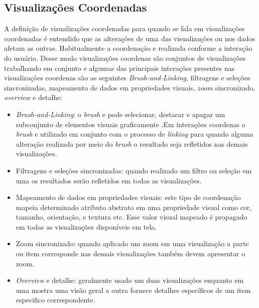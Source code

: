 \documentclass[
	12pt,				%
	openright,			%
	oneside,			%
	a4paper,			%
	english,			%
	brazil				%
	]{abntex2}
\begin{document}
\subsection{Visualizações Coordenadas}
A definição de visualizações coordenadas para \cite{roberts2007state} quando se fala em visualizações coordenadas   é entendido que as alterações de uma das visualizações ou nos dados afetam as outras. Habitualmente a coordenação e realizada conforme a interação do usuário. Desse modo visualizações coordenas são conjuntos de visualizações trabalhando em conjunto e algumas das principais interações presentes nas visualizações coordenas são as seguintes \textit{Brush-and-Linking}, filtragens e seleções sincronizadas, mapeamento de dados em propriedades visuais, \textit{zoom} sincronizado, \textit{overview} e detalhe:

\begin{itemize}
    \item \textit{Brush-and-Linking}: o \textit{brush} e pode selecionar, destacar e apagar um subconjunto de elementos visuais graficamente \cite{martin1995high} .Em interações coordenas o \textit{brush} e utilizado em conjunto com o processo de \textit{linking} para quando alguma alteração realizada por meio do \textit{brush} o resultado seja refletidos nas demais visualizações.
    
    \item Filtragens e seleções sincronizadas: quando realizado um filtro ou seleção em uma os resultados serão refletidos em todas as visualizações. 
    
    \item Mapeamento de dados em propriedades visuais: 
este tipo de coordenação mapeia determinado atributo abstrato em uma propriedade visual como cor, tamanho, orientação, e textura etc. Esse valor visual mapeado é propagado em todas as visualizações disponíveis em tela.

    \item Zoom sincronizado: quando aplicado um zoom em uma visualização a parte ou item corresponde nas demais visualizações também devem apresentar o zoom.
    
    \item \textit{Overview} e detalhe: geralmente usado um duas visualizações enquanto em uma mostra uma visão geral a outra fornece detalhes específicos de um item especifico correspondente.

\end{itemize}
\end{document}

